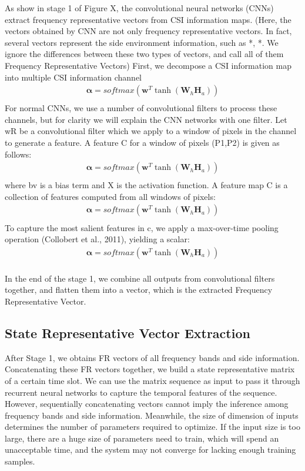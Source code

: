 \documentclass[10pt,conference,letterpaper]{IEEEtran}
\begin{document}
As show in stage 1 of Figure X, the convolutional neural networks (CNNs) extract frequency representative vectors from CSI information maps. (Here, the vectors obtained by CNN are not only frequency representative vectors. In fact, several vectors represent the side environment information, such as *, *.  We ignore the differences between these two types of vectors, and call all of them Frequency Representative Vectors) First, we decompose a CSI information map into multiple CSI information channel
\begin{eqnarray}
\mathbf{\alpha}  = softmax \left( {{\mathbf{w}^T}\tanh({\mathbf{W}_h}\mathbf{H}_a)} \right)\label{eq:9}\\
\end{eqnarray}
For normal CNNs, we use a number of convolutional filters to process these channels, but for clarity we will explain the CNN networks with one filter. Let wR be a convolutional filter which we apply to a window of pixels in the channel to generate a feature.  A feature C for a window of pixels (P1,P2) is given as follows:
\begin{eqnarray}
\mathbf{\alpha}  = softmax \left( {{\mathbf{w}^T}\tanh({\mathbf{W}_h}\mathbf{H}_a)} \right)\label{eq:9}\\
\end{eqnarray}
where bv is a bias term and X is the activation function.  A feature map C is a collection of features computed from all windows of pixels:
\begin{eqnarray}
\mathbf{\alpha}  = softmax \left( {{\mathbf{w}^T}\tanh({\mathbf{W}_h}\mathbf{H}_a)} \right)\label{eq:9}\\
\end{eqnarray}
To capture the most salient features in c, we apply a max-over-time pooling operation (Collobert et al., 2011), yielding a scalar:
\begin{eqnarray}
\mathbf{\alpha}  = softmax \left( {{\mathbf{w}^T}\tanh({\mathbf{W}_h}\mathbf{H}_a)} \right)\label{eq:9}\\
\end{eqnarray}

In the end of the stage 1, we combine all outputs from convolutional filters together, and flatten them into a vector, which is the extracted Frequency Representative Vector.

\subsection{State Representative Vector Extraction}
After Stage 1, we obtains FR vectors of all frequency bands and side information. Concatenating these FR vectors together, we build a state representative matrix of a certain time slot. We can use the matrix sequence as input to pass it through recurrent neural networks to capture the temporal features of the sequence. However, sequentially concatenating vectors cannot imply the inference among frequency bands and side information. Meanwhile, the size of dimension of inputs determines the number of parameters required to optimize. If the input size is too large, there are a huge size of parameters need to train, which will spend an unacceptable time, and the system may not converge for lacking enough training samples. 
\end{document}
